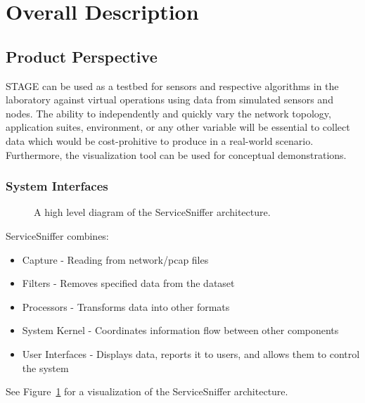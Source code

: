 \documentclass[titlepage]{article}
\begin{document}

\section{Overall Description%
  \label{overall-description}%
}


\subsection{Product Perspective%
  \label{product-perspective}%
}

STAGE can be used as a testbed for sensors and respective algorithms in the laboratory against virtual operations using data from simulated sensors and nodes. The ability to independently and quickly vary the network topology, application suites, environment, or any other variable will be essential to collect data which would be cost-prohitive to produce in a real-world scenario. Furthermore, the visualization tool can be used for conceptual demonstrations.


\subsubsection{System Interfaces%
  \label{system-interfaces}%
}
\begin{figure}
    \centering
    \caption{A high level diagram of the ServiceSniffer architecture.}
    \label{g:system}
\end{figure}

ServiceSniffer combines:
\begin{itemize}
    \item Capture - Reading from network/pcap files
    \item Filters - Removes specified data from the dataset
    \item Processors - Transforms data into other formats
    \item System Kernel - Coordinates information flow between other components
    \item User Interfaces - Displays data, reports it to users, and allows them
        to control the system
\end{itemize}
See Figure~\ref{g:system} for a visualization of the ServiceSniffer
architecture.
\end{document}

